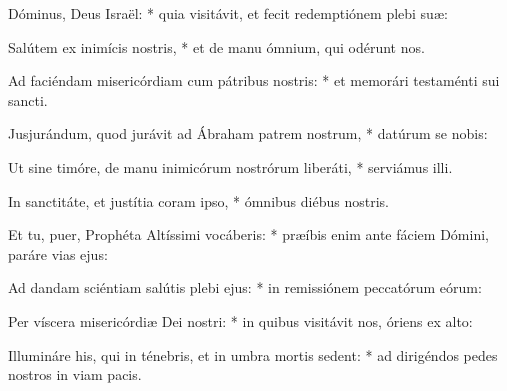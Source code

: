 \vspace{-1ex}

 {} Dóminus, Deus Isra{\"e}l: * quia visitávit, et fecit redemptiónem plebi su{\ae}:\par
{}
Salútem ex inimícis nostris, * et de manu ómnium, qui odérunt nos.\par
Ad faciéndam misericórdiam cum pátribus nostris: * et memorári testaménti sui sancti.\par
Jusjurándum, quod jurávit ad Ábraham patrem nostrum, * datúrum se nobis:\par
Ut sine timóre, de manu inimicórum nostrórum liberáti, * serviámus illi.\par
In sanctitáte, et justítia coram ipso, * ómnibus diébus nostris.\par
Et tu, puer, Prophéta Altíssimi vocáberis: * pr{\ae}íbis enim ante fáciem Dómini, paráre vias ejus:\par
Ad dandam sciéntiam salútis plebi ejus: * in remissiónem peccatórum eórum:\par
Per víscera misericórdi{\ae} Dei nostri: * in quibus visitávit nos, óriens ex alto:\par
Illumináre his, qui in ténebris, et in umbra mortis sedent: * ad dirigéndos pedes nostros in viam pacis.

